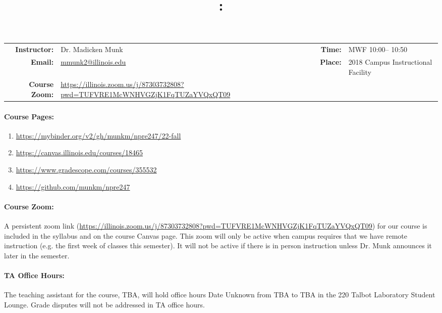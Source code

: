 \documentclass[11pt, a4paper]{article}
\title{\CourseNumber: \CourseTitle\\}
\author{\CourseUniversity}
\date{\CourseSemester \CourseYear}
\makeatletter
\newcommand{\CourseInstructor}{Dr. Madicken Munk\xspace}%
\newcommand{\CourseDays}{MWF\xspace}%
\newcommand{\CourseStart}{10:00\xspace}%
\newcommand{\CourseEnd}{10:50\xspace}%
\newcommand{\CourseInstructorEmail}{mmunk2@illinois.edu}
\newcommand{\CourseRoom}{2018\xspace}%
\newcommand{\CourseBuilding}{Campus Instructional Facility\xspace}%
\newcommand{\CourseZoom}{https://illinois.zoom.us/j/87303732808?pwd=TUFVRE1McWNHVGZjK1FqTUZaYVQxQT09}%
\newcommand{\TeachingAssistant}{TBA\xspace}%
\newcommand{\TAOfficeHourDays}{Date Unknown \xspace}%
\newcommand{\TAOfficeHourStart}{TBA\xspace}%
\newcommand{\TAOfficeHourEnd}{TBA\xspace}%
\newcommand{\TAOfficeHourPlace}{the 220 Talbot Laboratory Student Lounge\xspace}
\makeatother
\begin{document}
\maketitle
\renewcommand{\arraystretch}{1.5}
\begin{center}
\begin{table}[h]
\begin{tabularx}{\textwidth}{rXrX}
\hline
\textbf{Instructor:} & \CourseInstructor & \textbf{Time:} & \CourseDays \CourseStart -- \CourseEnd \\
\textbf{Email:} &  \href{mailto:\CourseInstructorEmail}{\CourseInstructorEmail} & \textbf{Place:} & \CourseRoom \CourseBuilding\\
\textbf{Course Zoom:} & \url{\CourseZoom} & & \\
\hline
\end{tabularx}
\end{table}
\end{center}

\paragraph{Course Pages:}
\begin{enumerate}
        \item \url{https://mybinder.org/v2/gh/munkm/npre247/22-fall}
        \item \url{https://canvas.illinois.edu/courses/18465}
        \item \url{https://www.gradescope.com/courses/355532}
        \item \url{https://github.com/munkm/npre247}
\end{enumerate}

\paragraph{Course Zoom:} A persistent zoom link (\url{\CourseZoom})
for our course is included in
the syllabus and on the course Canvas page.
This zoom will only be active when campus
requires that we have remote instruction (e.g. the first week of classes this
semester). It will not be active if there is in person instruction unless Dr.
Munk announces it later in the semester.

\paragraph{TA Office Hours:} The teaching assistant for the course,
\TeachingAssistant, will hold office hours \TAOfficeHourDays from
\TAOfficeHourStart to \TAOfficeHourEnd in \TAOfficeHourPlace.
Grade disputes will not be addressed in TA office hours.
\end{document}
